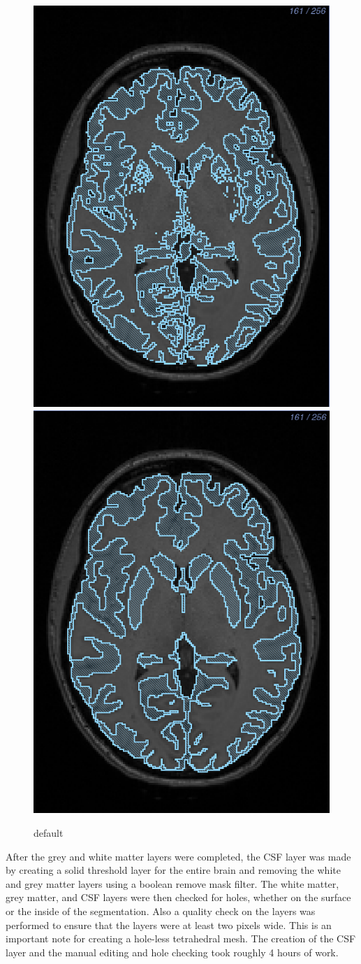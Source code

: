 \begin{figure}[H]
\begin{center}
\includegraphics[width=.49\textwidth]{Figures/greymatter_before_nuclei}
\includegraphics[width=.49\textwidth]{Figures/greymatter_added_nuclei}
\caption{default}
\label{default}
\end{center}
\end{figure}

After the grey and white matter layers were completed, the CSF layer was made by creating a solid threshold layer for the entire brain and removing the white and grey matter layers using a boolean remove mask filter. The white matter, grey matter, and CSF layers were then checked for holes, whether on the surface or the inside of the segmentation. Also a quality check on the layers was performed to ensure that the layers were at least two pixels wide. This is an important note for creating a hole-less tetrahedral mesh. The creation of the CSF layer and the manual editing and hole checking took roughly 4 hours of work.

